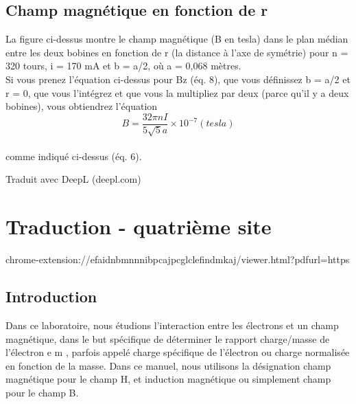 \documentclass[../main.tex]{subfiles}
\begin{document}
\subsection{Champ magnétique en fonction de r}
La figure ci-dessus montre le champ magnétique (B en tesla) dans le plan médian entre les deux bobines en fonction de r (la distance à l'axe de symétrie) pour n = 320 tours, i = 170 mA et b = a/2, où a = 0,068 mètres.\\
Si vous prenez l'équation ci-dessus pour Bz (éq. 8), que vous définissez b = a/2 et r = 0, que vous l'intégrez et que vous la multipliez par deux (parce qu'il y a deux bobines), vous obtiendrez l'équation\\
$$B = \frac{32 \pi n I}{5 \sqrt{5}a} \times 10^{-7} (tesla)$$ \\
comme indiqué ci-dessus (éq. 6). 


Traduit avec DeepL (deepl.com)

\section{Traduction - quatrième site}
chrome-extension://efaidnbmnnnibpcajpcglclefindmkaj/viewer.html?pdfurl=https%
\subsection{Introduction}
Dans ce laboratoire, nous étudions l'interaction entre les électrons et un champ magnétique, dans le but spécifique de déterminer le rapport charge/masse de l'électron e m , parfois appelé charge spécifique de l'électron ou charge normalisée en fonction de la masse. Dans ce manuel, nous utilisons la désignation champ magnétique pour le champ H, et induction magnétique ou simplement champ pour le champ B. 
\end{document}

